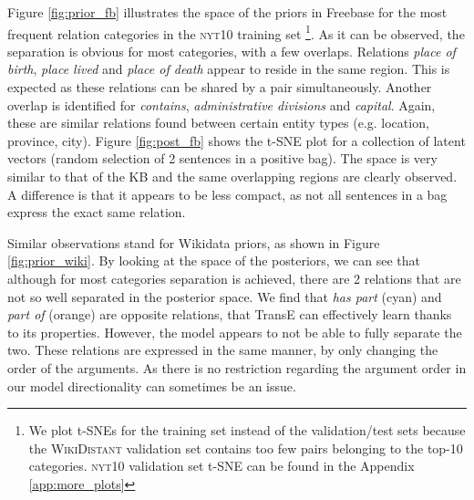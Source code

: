 \documentclass[11pt]{article}
\begin{document}
Figure \ref{fig:prior_fb} illustrates the space of the priors in Freebase for the most frequent relation categories in the \textsc{nyt10} training set
\footnote{We plot t-SNEs for the training set instead of the validation/test sets because the \textsc{WikiDistant} validation set contains too few pairs belonging to the top-10 categories. \textsc{nyt10} validation set t-SNE can be found in the Appendix \ref{app:more_plots}}.
As it can be observed, the separation is obvious for most categories, with a few overlaps. Relations \textit{place of birth}, \textit{place lived} and \textit{place of death} appear to reside in the same region. This is expected as these relations can be shared by a pair simultaneously. Another overlap is identified for \textit{contains}, \textit{administrative divisions} and \textit{capital}. Again, these are similar relations found between certain entity types (e.g. location, province, city).
Figure \ref{fig:post_fb} shows the t-SNE plot for a collection of latent vectors (random selection of 2 sentences in a positive bag). The space is very similar to that of the KB and the same overlapping regions are clearly observed. 
A difference is that it appears to be less compact, as not all sentences in a bag express the exact same relation. 

Similar observations stand for Wikidata priors, as shown in Figure \ref{fig:prior_wiki}.
By looking at the space of the posteriors, we can see that although for most categories separation is achieved, there are 2 relations that are not so well separated in the posterior space. We find that \textit{has part} (cyan) and \textit{part of} (orange) are opposite relations, that TransE can effectively learn thanks to its properties. However, the model appears to not be able to fully separate the two. These relations are expressed in the same manner, by only changing the order of the arguments. As there is no restriction regarding the argument order in our model directionality can sometimes be an issue.
\end{document}
